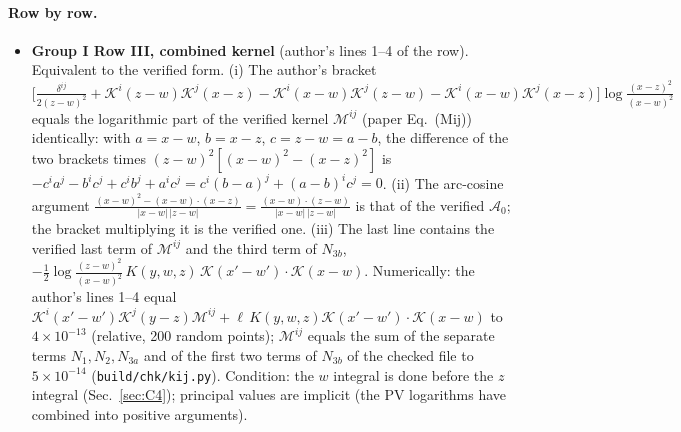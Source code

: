 \documentclass[9pt]{article}
\numberwithin{equation}{section}
\begin{document}
\paragraph{Row by row.}
\begin{itemize}
\item[A1] \textbf{Group I Row III, combined kernel} (author's lines 1--4 of the row). Equivalent to the verified form. (i) The author's bracket $\big[\frac{\delta^{ij}}{2(z-w)^{2}}+\mathcal{K}^{i}(z-w)\mathcal{K}^{j}(x-z)-\mathcal{K}^{i}(x-w)\mathcal{K}^{j}(z-w)-\mathcal{K}^{i}(x-w)\mathcal{K}^{j}(x-z)\big]\log\frac{(x-z)^{2}}{(x-w)^{2}}$ equals the logarithmic part of the verified kernel $\mathcal{M}^{ij}$ (paper Eq.~(Mij)) identically: with $a=x-w$, $b=x-z$, $c=z-w=a-b$, the difference of the two brackets times $(z-w)^{2}[(x-w)^{2}-(x-z)^{2}]$ is $-c^{i}a^{j}-b^{i}c^{j}+c^{i}b^{j}+a^{i}c^{j}=c^{i}(b-a)^{j}+(a-b)^{i}c^{j}=0$. (ii) The arc-cosine argument $\frac{(x-w)^{2}-(x-w)\cdot(x-z)}{|x-w|\,|z-w|}=\frac{(x-w)\cdot(z-w)}{|x-w|\,|z-w|}$ is that of the verified $\mathcal{A}_{0}$; the bracket multiplying it is the verified one. (iii) The last line contains the verified last term of $\mathcal{M}^{ij}$ and the third term of $N_{3b}$, $-\frac12\log\frac{(z-w)^{2}}{(x-w)^{2}}\,K(y,w,z)\,\mathcal{K}(x'-w')\cdot\mathcal{K}(x-w)$. Numerically: the author's lines 1--4 equal $\mathcal{K}^{i}(x'-w')\mathcal{K}^{j}(y-z)\mathcal{M}^{ij}+\ell\,K(y,w,z)\mathcal{K}(x'-w')\cdot\mathcal{K}(x-w)$ to $4\times10^{-13}$ (relative, 200 random points); $\mathcal{M}^{ij}$ equals the sum of the separate terms $N_{1},N_{2},N_{3a}$ and of the first two terms of $N_{3b}$ of the checked file to $5\times10^{-14}$ (\texttt{build/chk/kij.py}). Condition: the $w$ integral is done before the $z$ integral (Sec.~\ref{sec:C4}); principal values are implicit (the PV logarithms have combined into positive arguments).

\end{itemize}
\end{document}
